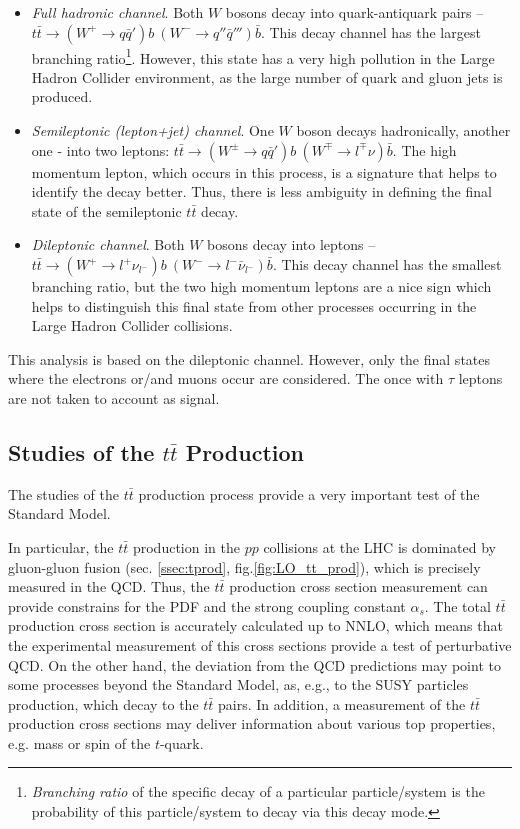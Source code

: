 \begin{itemize}
 \item \textit{Full hadronic channel}. Both $W$ bosons decay into quark-antiquark pairs -- $t\bar{t} \rightarrow (W^{+} \rightarrow q\bar{q}')b\:(W^{-} \rightarrow q''\bar{q}''')\bar{b}$.
 This decay channel has the largest branching ratio\footnote{\textit{Branching ratio} of the specific decay of a particular particle/system is the probability of this particle/system
 to decay via this decay mode.}. However, this state has a very high pollution in the Large Hadron Collider environment, as the large number of quark and gluon jets is produced.
 
 \item \textit{Semileptonic (lepton+jet) channel}. One $W$ boson decays hadronically, another one - into two leptons:  $t\bar{t} \rightarrow (W^{\pm} \rightarrow q\bar{q}')b \: (W^{\mp} \rightarrow l^{\mp}\nu)\bar{b}$.
 The high momentum lepton, which occurs in this process, is a signature that helps to identify the decay better. Thus, there is less
 ambiguity in defining the final state of the semileptonic $t\bar{t}$ decay.
 
 \item \textit{Dileptonic channel}. Both $W$ bosons decay into leptons -- $t\bar{t} \rightarrow (W^{+} \rightarrow l^{+}\nu_{l^{-}})b \: (W^{-} \rightarrow l^{-}\bar{\nu}_{l^{-}})\bar{b}$.
 This decay channel has the smallest branching ratio, but the two high momentum leptons are a nice sign which helps to distinguish this final state from other processes
 occurring in the Large Hadron Collider collisions.
\end{itemize}

This analysis is based on the dileptonic channel. However, only the final states where the electrons or/and muons occur are considered. The once with $\tau$ leptons are 
not taken to account as signal.

\subsection{Studies of the $t\bar{t}$ Production}

The studies of the $t\bar{t}$ production process provide a very important test of the Standard Model. 

In particular, the $t\bar{t}$ production in the $pp$ collisions at the LHC is dominated by gluon-gluon fusion (sec. \ref{ssec:tprod}, fig.\ref{fig:LO_tt_prod}), which 
is precisely measured in the QCD. Thus, the $t\bar{t}$ production cross section measurement can provide constrains for the PDF and the strong coupling constant $\alpha_s$.
The total $t\bar{t}$ production cross section is accurately calculated up to NNLO, which means that the experimental measurement of this cross sections provide a 
test of perturbative QCD.
On the other hand, the deviation from the QCD predictions may point to some processes beyond the Standard Model, as, e.g., to the SUSY particles production, which decay
to the $t\bar{t}$ pairs. In addition, a measurement of the $t\bar{t}$ production cross sections may deliver information about various top properties, e.g. mass or spin
of the $t$-quark.
